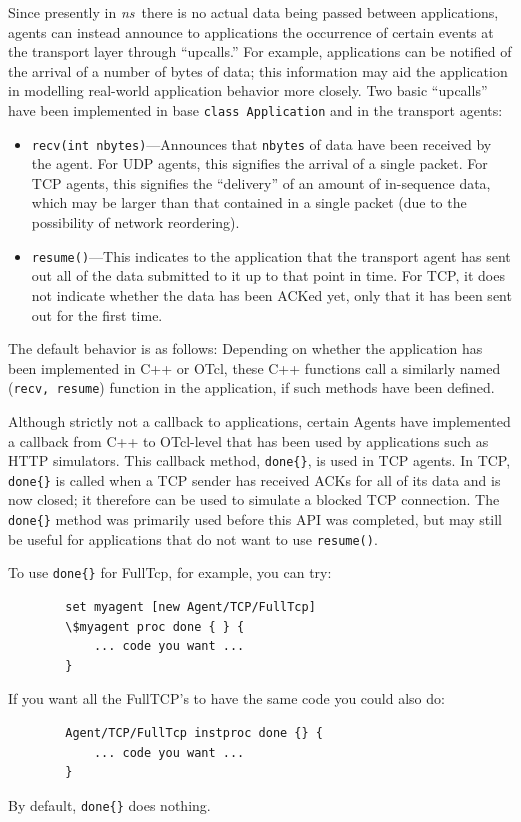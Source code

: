 Since presently in \emph{ns}~there is no actual data being passed between 
applications, agents can instead announce to applications the occurrence of 
certain events at the transport layer through ``upcalls.''  For example,
applications can be notified of the arrival of a number of bytes of data;
this information may aid the application in modelling real-world application
behavior more closely.  Two basic ``upcalls'' have been implemented in 
base {\tt class Application} and in the transport agents:
\begin{itemize} 
\item {\tt recv(int nbytes)}---Announces that {\tt nbytes} of data have been
received by the agent.  For UDP agents, this signifies the arrival of
a single packet.  For TCP agents, this signifies the ``delivery'' of an 
amount of in-sequence data, which may be larger than that contained in a 
single packet (due to the possibility of network reordering).
\item {\tt resume()}---This indicates to the application that the transport
agent has sent out all of the data submitted to it up to that point in time.  
For TCP, it does not indicate whether the data has been ACKed yet, only that
it has been sent out for the first time. 
\end{itemize}
The default behavior is as follows: 
Depending on whether the application has been implemented in C++ or OTcl, these
C++ functions 
call a similarly named ({\tt recv, resume}) function in the application,
if such methods have been defined.   

Although strictly not a callback to applications, certain Agents have
implemented a callback from C++ to OTcl-level that has been used by 
applications such as HTTP simulators.  This callback method, {\tt done\{\}},
is used in TCP agents.  In TCP, {\tt done\{\}} is called when a TCP sender 
has received ACKs for all of its data and is now closed; it therefore can
be used to simulate a blocked TCP connection.  The {\tt done\{\}}
method was primarily used before this API was completed, but may still be
useful for applications that do not want to use {\tt resume()}.

To use {\tt done\{\}} for FullTcp, for example, you can try:
\begin{verbatim}
        set myagent [new Agent/TCP/FullTcp]
        \$myagent proc done { } {
            ... code you want ...
        }
\end{verbatim}
If you want all the FullTCP's to have the same code you could also do:
\begin{verbatim}
        Agent/TCP/FullTcp instproc done {} {
            ... code you want ...
        }
\end{verbatim}
By default, {\tt done\{\}} does nothing.

